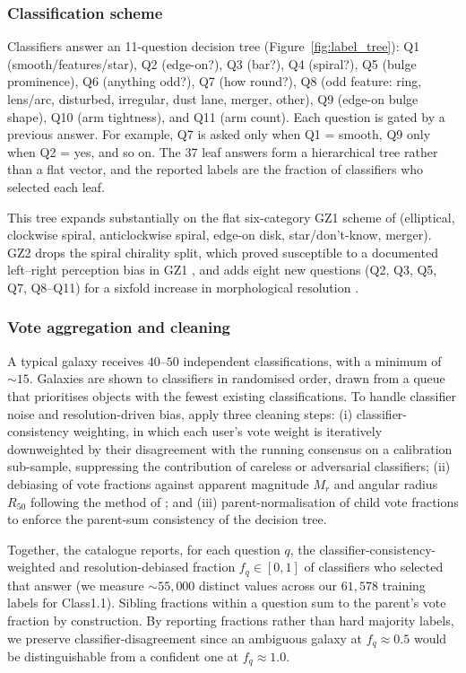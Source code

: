 \documentclass[10pt,preprint2]{aastex}
\begin{document}
\subsubsection{Classification scheme}

Classifiers answer an 11-question decision tree (Figure~\ref{fig:label_tree}): Q1 (smooth/features/star), Q2 (edge-on?), Q3 (bar?), Q4 (spiral?), Q5 (bulge prominence), Q6 (anything odd?), Q7 (how round?), Q8 (odd feature: ring, lens/arc, disturbed, irregular, dust lane, merger, other), Q9 (edge-on bulge shape), Q10 (arm tightness), and Q11 (arm count). Each question is gated by a previous answer. For example, Q7 is asked only when Q1 = smooth, Q9 only when Q2 = yes, and so on. The 37 leaf answers form a hierarchical tree rather than a flat vector, and the reported labels are the fraction of classifiers who selected each leaf.

This tree expands substantially on the flat six-category GZ1 scheme of \citet{Lintott2008} (elliptical, clockwise spiral, anticlockwise spiral, edge-on disk, star/don't-know, merger). GZ2 drops the spiral chirality split, which proved susceptible to a documented left--right perception bias in GZ1 \citep{Land2008}, and adds eight new questions (Q2, Q3, Q5, Q7, Q8--Q11) for a sixfold increase in morphological resolution \citep{Willett2013}.

\subsubsection{Vote aggregation and cleaning}

A typical galaxy receives $40$--$50$ independent classifications, with a minimum of $\sim 15$. Galaxies are shown to classifiers in randomised order, drawn from a queue that prioritises objects with the fewest existing classifications. To handle classifier noise and resolution-driven bias, \citet{Willett2013} apply three cleaning steps: (i) classifier-consistency weighting, in which each user's vote weight is iteratively downweighted by their disagreement with the running consensus on a calibration sub-sample, suppressing the contribution of careless or adversarial classifiers; (ii) debiasing of vote fractions against apparent magnitude $M_r$ and angular radius $R_{50}$ following the method of \citet{Bamford2009}; and (iii) parent-normalisation of child vote fractions to enforce the parent-sum consistency of the decision tree. 

Together, the catalogue reports, for each question $q$, the classifier-consistency-weighted and resolution-debiased fraction $f_q \in [0, 1]$ of classifiers who selected that answer (we measure $\sim 55{,}000$ distinct values across our $61{,}578$ training labels for Class1.1). Sibling fractions within a question sum to the parent's vote fraction by construction. By reporting fractions rather than hard majority labels, we preserve classifier-disagreement since an ambiguous galaxy at $f_q \approx 0.5$ would be distinguishable from a confident one at $f_q \approx 1.0$. 
\end{document}
